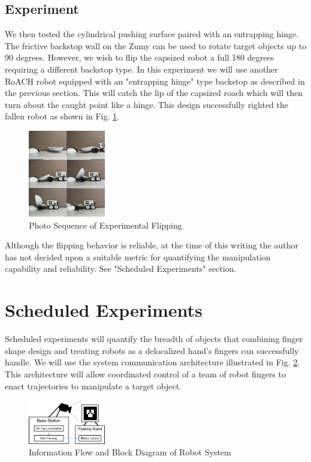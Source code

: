 \documentclass[runningheads,a4paper]{llncs}
\begin{document}
\subsection{Experiment}
We then tested the cylindrical pushing surface paired with an entrapping hinge.
The frictive backstop wall on the Zumy can be used to rotate target objects up to 90 degrees.
However, we wish to flip the capsized robot a full 180 degrees requiring a different backstop type.
In this experiment we will use another RoACH robot equipped with an "entrapping hinge" type backstop as described in the previous section.
This will catch the lip of the capsized roach which will then turn about the caught point like a hinge.
This design successfully righted the fallen robot as shown in Fig. \ref{fig:photos}.

\begin{figure}[h!]
\centering
\includegraphics[width=0.3\textwidth]{Photo_Sequence.jpg}
\caption{\label{fig:photos}Photo Sequence of Experimental Flipping}
\end{figure}

Although the flipping behavior is reliable, at the time of this writing the author has not decided upon a suitable metric for quantifying the manipulation capability and reliability. See "Scheduled Experiments" section.

\clearpage
\section{Scheduled Experiments}
Scheduled experiments will quantify the breadth of objects that combining finger shape design and treating robots as a delocalized hand's fingers can successfully handle.
We will use the system communication architecture illustrated in Fig. \ref{fig:system}.
This architecture will allow coordinated control of a team of robot fingers to enact trajectories to manipulate a target object.

\begin{figure}[h!]
\centering
\includegraphics[width=0.3\textwidth]{System_Block_Diagram.png}
\caption{\label{fig:system}Information Flow and Block Diagram of Robot System}
\end{figure}
\end{document}
